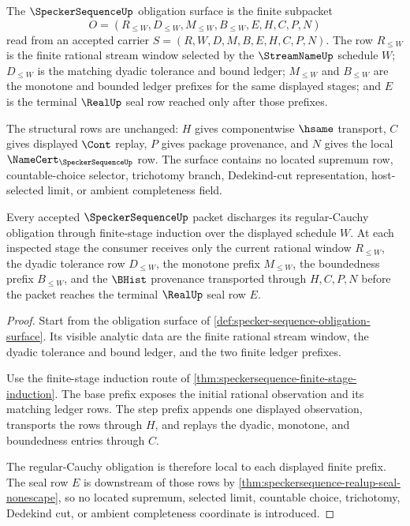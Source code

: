 \begin{definition}
\label{def:specker-sequence-obligation-surface}
The $\SpeckerSequenceUp$ obligation surface is the finite subpacket
$$
O=(R_{\leq W},D_{\leq W},M_{\leq W},B_{\leq W},E,H,C,P,N)
$$
read from an accepted carrier $S=(R,W,D,M,B,E,H,C,P,N)$. The row $R_{\leq W}$ is the finite rational stream window selected by the $\StreamNameUp$ schedule $W$; $D_{\leq W}$ is the matching dyadic tolerance and bound ledger; $M_{\leq W}$ and $B_{\leq W}$ are the monotone and bounded ledger prefixes for the same displayed stages; and $E$ is the terminal $\RealUp$ seal row reached only after those prefixes.

The structural rows are unchanged: $H$ gives componentwise $\hsame$ transport, $C$ gives displayed $\Cont$ replay, $P$ gives package provenance, and $N$ gives the local $\NameCert_{\SpeckerSequenceUp}$ row. The surface contains no located supremum row, countable-choice selector, trichotomy branch, Dedekind-cut representation, host-selected limit, or ambient completeness field.
\end{definition}

\begin{theorem}
\label{thm:specker-sequence-regular-cauchy-obligation}
Every accepted $\SpeckerSequenceUp$ packet discharges its regular-Cauchy obligation through finite-stage induction over the displayed schedule $W$. At each inspected stage the consumer receives only the current rational window $R_{\leq W}$, the dyadic tolerance row $D_{\leq W}$, the monotone prefix $M_{\leq W}$, the boundedness prefix $B_{\leq W}$, and the $\BHist$ provenance transported through $H,C,P,N$ before the packet reaches the terminal $\RealUp$ seal row $E$.
\end{theorem}
\begin{proof}
Start from the obligation surface of \autoref{def:specker-sequence-obligation-surface}. Its visible analytic data are the finite rational stream window, the dyadic tolerance and bound ledger, and the two finite ledger prefixes.

Use the finite-stage induction route of \autoref{thm:speckersequence-finite-stage-induction}. The base prefix exposes the initial rational observation and its matching ledger rows. The step prefix appends one displayed observation, transports the rows through $H$, and replays the dyadic, monotone, and boundedness entries through $C$.

The regular-Cauchy obligation is therefore local to each displayed finite prefix. The seal row $E$ is downstream of those rows by \autoref{thm:speckersequence-realup-seal-nonescape}, so no located supremum, selected limit, countable choice, trichotomy, Dedekind cut, or ambient completeness coordinate is introduced.
\end{proof}

